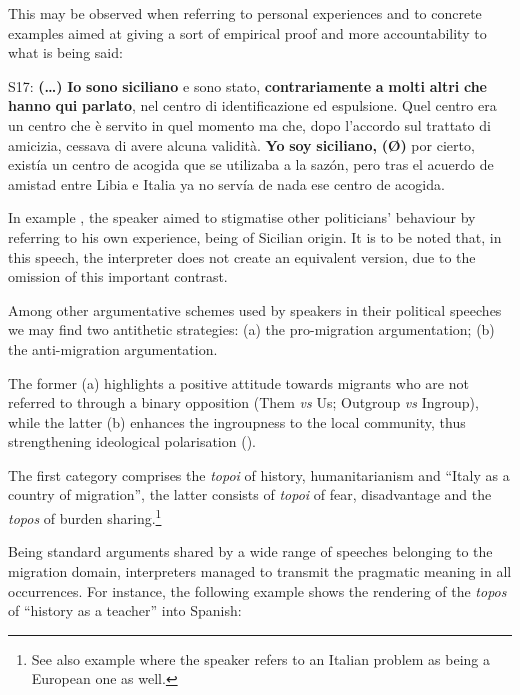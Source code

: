 \documentclass[output=paper]{langscibook}
\begin{document}
This may be observed when referring to personal experiences and to concrete examples aimed at giving a sort of empirical proof and more accountability to what is being said:

\ea\label{ex:mori:18}
\ea
S17: \textbf{(\ldots)} \textbf{Io} \textbf{sono} \textbf{siciliano} e sono stato, \textbf{contrariamente} \textbf{a} \textbf{molti} \textbf{altri} \textbf{che} \textbf{hanno} \textbf{qui} \textbf{parlato}, nel centro di identificazione ed espulsione. Quel centro era un centro che è servito in quel momento ma che, dopo l’accordo sul trattato di amicizia, cessava di avere alcuna validità.
\ex
\textbf{Yo} \textbf{soy} \textbf{siciliano,} \textbf{(Ø)} por cierto, existía un centro de acogida que se utilizaba a la sazón, pero tras el acuerdo de amistad entre Libia e Italia ya no servía de nada ese centro de acogida.
\z
\z

In   example , the speaker aimed to stigmatise other politicians’ behaviour by referring to his own experience, being of Sicilian origin. It is to be noted that, in this speech, the interpreter does not create an equivalent version, due to the omission of this important contrast.

\begin{sloppypar}
Among other argumentative schemes used by speakers in their political speeches we may find two antithetic strategies: (a) the pro-migration argumentation; (b) the anti-migration argumentation.
\end{sloppypar}

The former (a) highlights a positive attitude towards migrants who are not referred to through a binary opposition (Them \textit{vs} Us; Outgroup \textit{vs} Ingroup), while the latter (b) enhances the ingroupness to the local community, thus strengthening ideological polarisation ().

The first category comprises the \textit{topoi} of history, humanitarianism and “Italy as a country of migration”, the latter consists of \textit{topoi} of fear, disadvantage and the \textit{topos} of burden sharing.\footnote{See also example  where the speaker refers to an Italian problem as being a European one as well.}

Being standard arguments shared by a wide range of speeches belonging to the migration domain, interpreters managed to transmit the pragmatic meaning in all occurrences. For instance, the following example shows the rendering of the \textit{topos} of “history as a teacher” into Spanish:
\end{document}
